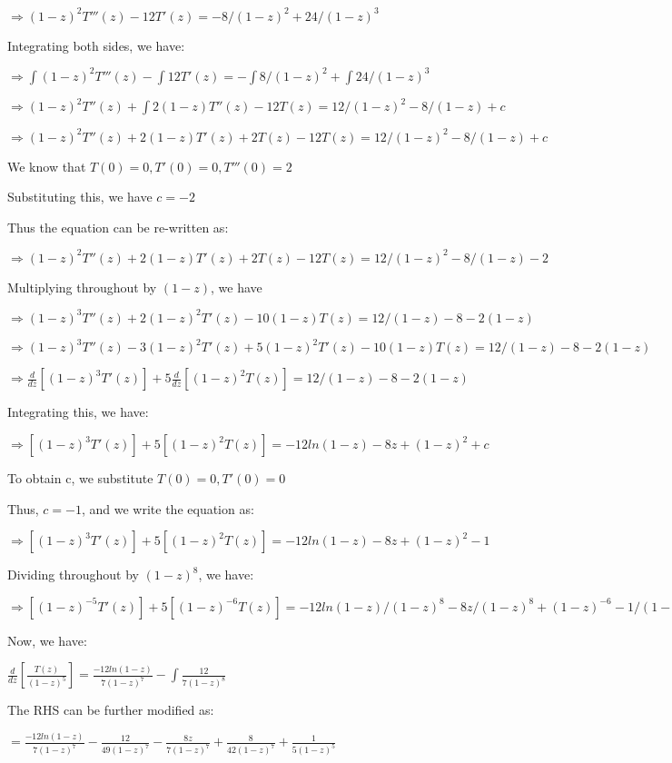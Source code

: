 \documentclass[11pt]{article}
\begin{document}
$\Longrightarrow (1-z)^2 T'''(z) -12 T'(z) = -8/(1-z)^2 + 24/(1-z)^3$

Integrating both sides, we have:

$\Longrightarrow \int(1-z)^2 T'''(z) -\int12 T'(z) = -\int8/(1-z)^2 + \int24/(1-z)^3$

$\Longrightarrow (1-z)^2T''(z) + \int 2(1-z)T''(z) - 12T(z) = 12/(1-z)^2 - 8/(1-z) + c$

$\Longrightarrow (1-z)^2T''(z) + 2(1-z)T'(z) + 2T(z) - 12T(z) = 12/(1-z)^2 - 8/(1-z) + c$

We know that $T(0) = 0, T'(0) = 0, T'''(0)=2$

Substituting this, we have $c=-2$

Thus the equation can be re-written as:

$\Longrightarrow (1-z)^2T''(z) + 2(1-z)T'(z) + 2T(z) - 12T(z) = 12/(1-z)^2 - 8/(1-z) - 2$

Multiplying throughout by $(1-z)$, we have

$\Longrightarrow (1-z)^3T''(z) + 2(1-z)^2T'(z) -10(1-z)T(z) = 12/(1-z) - 8 - 2(1-z)$

$\Longrightarrow (1-z)^3T''(z) - 3(1-z)^2T'(z) + 5(1-z)^2T'(z) -10(1-z)T(z) = 12/(1-z) - 8 - 2(1-z)$

$\Longrightarrow \frac{d}{dz}{[(1-z)^3T'(z)]} + 5\frac{d}{dz}{[(1-z)^2T(z)]} = 12/(1-z) - 8 - 2(1-z)$

Integrating this, we have:

$\Longrightarrow {[(1-z)^3T'(z)]} + 5{[(1-z)^2T(z)]} = -12ln(1-z) - 8z + (1-z)^2 + c$

To obtain c, we substitute $T(0) =0, T'(0)=0 $

Thus, $c=-1$, and we write the equation as:

$\Longrightarrow {[(1-z)^3T'(z)]} + 5{[(1-z)^2T(z)]} = -12ln(1-z) - 8z + (1-z)^2 -1$

Dividing throughout by $(1-z)^8$, we have:

$\Longrightarrow {[(1-z)^{-5}T'(z)]} + 5{[(1-z)^{-6}T(z)]} = -12ln(1-z)/(1-z)^8 - 8z/(1-z)^8 + (1-z)^{-6} -1/(1-z)^8$

Now, we have:

$\frac{d}{dz}[\frac{T(z)}{(1-z)^5}] = \frac{-12ln(1-z)}{7(1-z)^7} - \int \frac{12}{7(1-z)^8}$

The RHS can be further modified as:

$ = \frac{-12ln(1-z)}{7(1-z)^7} - \frac{12}{49(1-z)^7} - \frac{8z}{7(1-z)^7} + \frac{8}{42(1-z)^7} + \frac{1}{5(1-z)^5}$
\end{document}
